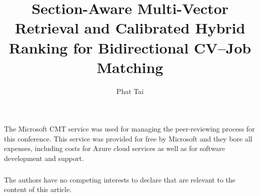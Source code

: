 \documentclass[runningheads]{llncs}
\begin{document}
\title{Section-Aware Multi-Vector Retrieval and Calibrated Hybrid Ranking for Bidirectional CV--Job Matching}


\author{Phat Tai}


\maketitle










\begin{credits}
\subsubsection{\ackname}
The Microsoft CMT service was used for managing the peer-reviewing process for this conference. This service was provided for free by Microsoft and they bore all expenses, including costs for Azure cloud services as well as for software development and support.

\subsubsection{\discintname}
The authors have no competing interests to declare that are relevant to the content of this article.
\end{credits}



\end{document}
